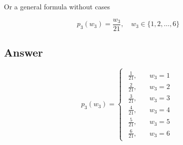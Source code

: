 \documentclass[12pt]{article}
\begin{document}
\begin{enumerate}[start=1,label={\bfseries Part \arabic*:},leftmargin=0in]
			Or a general formula without cases
			
			\[p_3(w_3) = \frac{w_3}{21},\quad w_3\in \{1,2,\dots,6\}\]
		
		\subsection*{Answer}
		
			\[\boxed{p_3(w_3) =
				\begin{cases}
					\begin{aligned}
						\frac{1}{21},&\quad w_3 = 1\\
						\frac{2}{21},&\quad w_3 = 2\\
						\frac{3}{21},&\quad w_3 = 3\\
						\frac{4}{21},&\quad w_3 = 4\\
						\frac{5}{21},&\quad w_3 = 5\\
						\frac{6}{21},&\quad w_3 = 6
					\end{aligned}
			\end{cases}}\]
	\end{enumerate}
	
\end{document}
